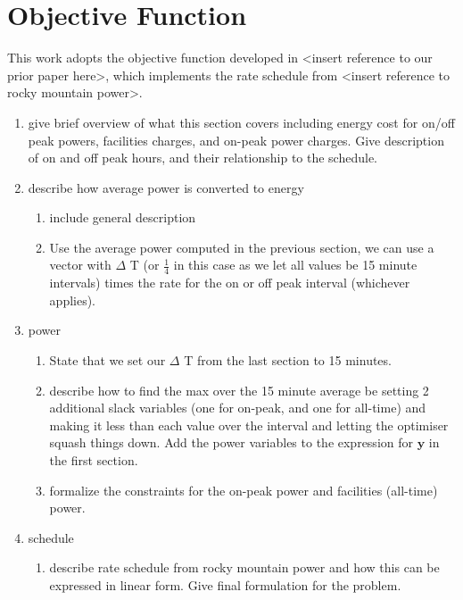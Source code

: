 \section{Objective Function}
This work adopts the objective function developed in <insert reference to our prior paper here>, which implements the rate schedule from <insert reference to rocky mountain power>. 
\begin{enumerate}
	\item give brief overview of what this section covers including energy cost for on/off peak powers, facilities charges, and on-peak power charges. Give description of on and off peak hours, and their relationship to the schedule.
	\item describe how average power is converted to energy 
		\begin{enumerate}
			\item include general description
			\item Use the average power computed in the previous section, we can use a vector with $\Delta$ T (or $\frac{1}{4}$ in this case as we let all values be 15 minute intervals) times the rate for the on or off peak interval (whichever applies). 
		\end{enumerate} 
	\item power
		\begin{enumerate}
			\item State that we set our $\Delta$ T from the last section to 15 minutes.
			\item describe how to find the max over the 15 minute average be setting 2 additional slack variables (one for on-peak, and one for all-time) and making it less than each value over the interval and letting the optimiser squash things down. Add the power variables to the expression for $\mathbf{y}$ in the first section.
			\item formalize the constraints for the on-peak power and facilities (all-time) power.  
		\end{enumerate}
	\item schedule
		\begin{enumerate}
			\item describe rate schedule from rocky mountain power and how this can be expressed in linear form.  Give final formulation for the problem.
		\end{enumerate}
\end{enumerate}
